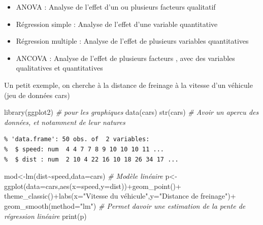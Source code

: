 \documentclass[
]{article}
\newenvironment{Shaded}{\begin{snugshade}}{\end{snugshade}}
\newcommand{\AttributeTok}[1]{\textcolor[rgb]{0.77,0.63,0.00}{#1}}
\newcommand{\CommentTok}[1]{\textcolor[rgb]{0.56,0.35,0.01}{\textit{#1}}}
\newcommand{\FunctionTok}[1]{\textcolor[rgb]{0.00,0.00,0.00}{#1}}
\newcommand{\NormalTok}[1]{#1}
\newcommand{\OtherTok}[1]{\textcolor[rgb]{0.56,0.35,0.01}{#1}}
\newcommand{\SpecialCharTok}[1]{\textcolor[rgb]{0.00,0.00,0.00}{#1}}
\newcommand{\StringTok}[1]{\textcolor[rgb]{0.31,0.60,0.02}{#1}}
\providecommand{\tightlist}{%
  \setlength{\itemsep}{0pt}\setlength{\parskip}{0pt}}
\begin{document}
\begin{itemize}
\tightlist
\item
  ANOVA : Analyse de l'effet d'un ou plusieurs facteurs qualitatif
\item
  Régression simple : Analyse de l'effet d'une variable quantitative
\item
  Régression multiple : Analyse de l'effet de plusieurs variables
  quantitatives
\item
  ANCOVA : Analyse de l'effet de plusieurs facteurs , avec des variables
  qualitatives et quantitatives
\end{itemize}

Un petit exemple, on cherche à la distance de freinage à la vitesse d'un
véhicule (jeu de données cars)

\begin{Shaded}
\begin{Highlighting}[]
\FunctionTok{library}\NormalTok{(ggplot2) }\CommentTok{\# pour les graphiques}
\FunctionTok{data}\NormalTok{(cars) }
\FunctionTok{str}\NormalTok{(cars) }\CommentTok{\# Avoir un apercu des données, et notamment de leur natures}
\end{Highlighting}
\end{Shaded}

\begin{verbatim}
% 'data.frame': 50 obs. of  2 variables:
%  $ speed: num  4 4 7 7 8 9 10 10 10 11 ...
%  $ dist : num  2 10 4 22 16 10 18 26 34 17 ...
\end{verbatim}

\begin{Shaded}
\begin{Highlighting}[]
\NormalTok{mod}\OtherTok{\textless{}{-}}\FunctionTok{lm}\NormalTok{(dist}\SpecialCharTok{\textasciitilde{}}\NormalTok{speed,}\AttributeTok{data=}\NormalTok{cars) }\CommentTok{\# Modèle linéaire}
\NormalTok{p}\OtherTok{\textless{}{-}}\FunctionTok{ggplot}\NormalTok{(}\AttributeTok{data=}\NormalTok{cars,}\FunctionTok{aes}\NormalTok{(}\AttributeTok{x=}\NormalTok{speed,}\AttributeTok{y=}\NormalTok{dist))}\SpecialCharTok{+}\FunctionTok{geom\_point}\NormalTok{()}\SpecialCharTok{+}
  \FunctionTok{theme\_classic}\NormalTok{()}\SpecialCharTok{+}\FunctionTok{labs}\NormalTok{(}\AttributeTok{x=}\StringTok{"Vitesse du véhicule"}\NormalTok{,}\AttributeTok{y=}\StringTok{"Distance de freinage"}\NormalTok{)}\SpecialCharTok{+}
  \FunctionTok{geom\_smooth}\NormalTok{(}\AttributeTok{method=}\StringTok{"lm"}\NormalTok{) }\CommentTok{\# Permet d\textquotesingle{}avoir une estimation de la pente de régression linéaire}
\FunctionTok{print}\NormalTok{(p)}
\end{Highlighting}
\end{Shaded}
\end{document}
